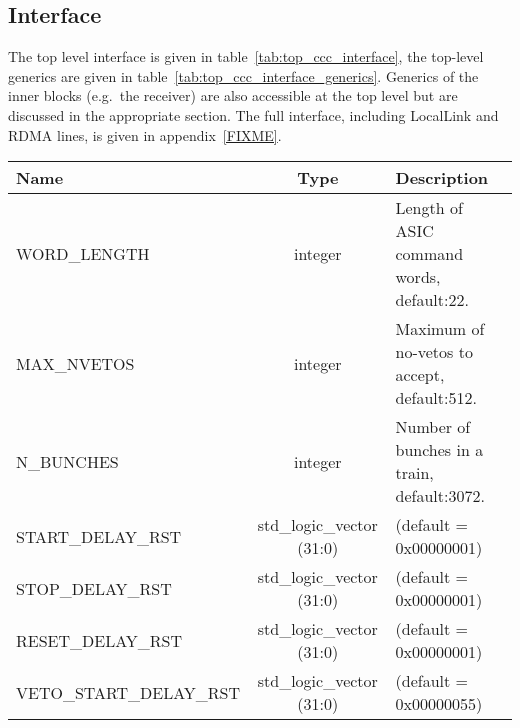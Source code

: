 \documentclass[]{article}
\newcommand*{\dittostraight}{---\textquotedbl---} %
\begin{document}
    \subsection{Interface} %
    \label{sub:top_interface}
    The top level interface is given in table~\ref{tab:top_ccc_interface}, the top-level generics are given in table~\ref{tab:top_ccc_interface_generics}. Generics of the inner blocks (e.g.\ the receiver) are also accessible at the top level but are discussed in the appropriate section. The full interface, including LocalLink and RDMA lines, is given in appendix~\ref{FIXME}. %
    \begin{table}
        \begin{center}
            \begin{tabulary}{\textwidth}{l | c | L}
                Name & Type & Description \\
                \hline
                WORD\_LENGTH               & integer                   & Length of ASIC command words, default:22.    \\
                MAX\_NVETOS                & integer                   & Maximum of no-vetos to accept, default:512.  \\
                N\_BUNCHES                 & integer                   & Number of bunches in a train, default:3072.  \\ 
                START\_DELAY\_RST          & std\_logic\_vector (31:0) & (default = 0x00000001)                \\
                STOP\_DELAY\_RST           & std\_logic\_vector (31:0) & (default = 0x00000001)                \\
                RESET\_DELAY\_RST          & std\_logic\_vector (31:0) & (default = 0x00000001)                \\
                VETO\_START\_DELAY\_RST    & std\_logic\_vector (31:0) & (default = 0x00000055)                \\

\end{tabulary}
\end{center}
\end{table}
\end{document}

